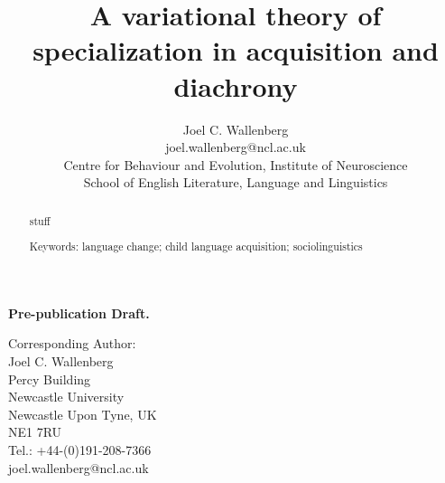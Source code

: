 \documentclass{artikel3}
\begin{document}
\title{A variational theory of specialization in acquisition and diachrony}

\author{Joel C. Wallenberg \vspace*{3mm} \\ \small{joel.wallenberg@ncl.ac.uk} \\ \small{Centre for Behaviour and Evolution, Institute of Neuroscience}\\
\small{School of English Literature, Language and Linguistics}}




\date{}



\maketitle

\textbf{Pre-publication Draft.}\\


\begin{abstract}
stuff

\noindent Keywords: language change; child language acquisition; sociolinguistics 

\end{abstract}
\vspace*{5mm}
\noindent Corresponding Author:\vspace*{3mm}\\
Joel C. Wallenberg\\
Percy Building\\
Newcastle University\\
Newcastle Upon Tyne, UK\\
NE1 7RU\\
Tel.: +44-(0)191-208-7366\\
joel.wallenberg@ncl.ac.uk

\pagebreak
\end{document}
